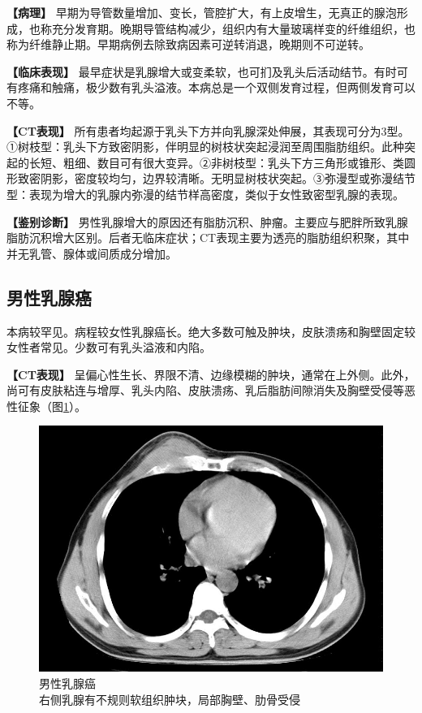 \textbf{【病理】}
早期为导管数量增加、变长，管腔扩大，有上皮增生，无真正的腺泡形成，也称充分发育期。晚期导管结构减少，组织内有大量玻璃样变的纤维组织，也称为纤维静止期。早期病例去除致病因素可逆转消退，晚期则不可逆转。

\textbf{【临床表现】}
最早症状是乳腺增大或变柔软，也可扪及乳头后活动结节。有时可有疼痛和触痛，极少数有乳头溢液。本病总是一个双侧发育过程，但两侧发育可以不等。

\textbf{【CT表现】}
所有患者均起源于乳头下方并向乳腺深处伸展，其表现可分为3型。①树枝型：乳头下方致密阴影，伴明显的树枝状突起浸润至周围脂肪组织。此种突起的长短、粗细、数目可有很大变异。②非树枝型：乳头下方三角形或锥形、类圆形致密阴影，密度较均匀，边界较清晰。无明显树枝状突起。③弥漫型或弥漫结节型：表现为增大的乳腺内弥漫的结节样高密度，类似于女性致密型乳腺的表现。

\textbf{【鉴别诊断】}
男性乳腺增大的原因还有脂肪沉积、肿瘤。主要应与肥胖所致乳腺脂肪沉积增大区别。后者无临床症状；CT表现主要为透亮的脂肪组织积聚，其中并无乳管、腺体或间质成分增加。

\subsection{男性乳腺癌}

本病较罕见。病程较女性乳腺癌长。绝大多数可触及肿块，皮肤溃疡和胸壁固定较女性者常见。少数可有乳头溢液和内陷。

\textbf{【CT表现】}
呈偏心性生长、界限不清、边缘模糊的肿块，通常在上外侧。此外，尚可有皮肤粘连与增厚、乳头内陷、皮肤溃疡、乳后脂肪间隙消失及胸壁受侵等恶性征象（图\ref{fig9-51}）。

\begin{figure}[!htbp]
 \centering
 \includegraphics[width=.7\textwidth,height=\textheight,keepaspectratio]{./images/Image00251.jpg}
 \captionsetup{justification=centering}
 \caption{男性乳腺癌\\{\small 右侧乳腺有不规则软组织肿块，局部胸壁、肋骨受侵}}
 \label{fig9-51}
  \end{figure} 

